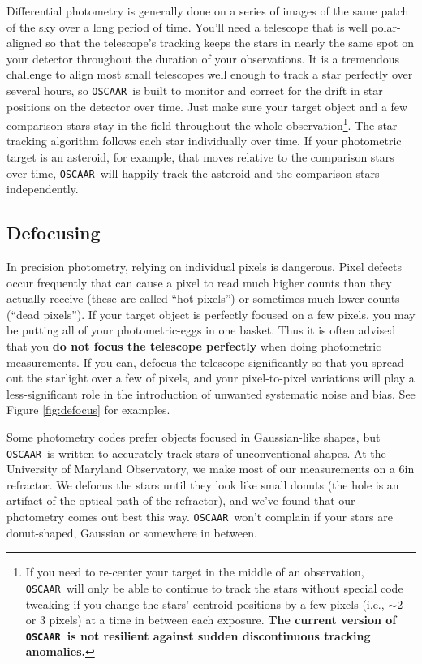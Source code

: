 \documentclass[a4paper]{article}
\newcommand{\code}[1]{\texttt{#1}}
\newcommand{\oscaar}{\code{OSCAAR}~}
\begin{document}
Differential photometry is generally done on a series of images of the same patch of the sky over a long period of time. You'll need a telescope that is well polar-aligned so that the telescope's tracking keeps the stars in nearly the same spot on your detector throughout the duration of your observations. It is a tremendous challenge to align most small telescopes well enough to track a star perfectly over several hours, so \oscaar is built to monitor and correct for the drift in star positions on the detector over time. Just make sure your target object and a few comparison stars stay in the field throughout the whole observation\footnote{If you need to re-center your target in the middle of an observation, \oscaar will only be able to continue to track the stars without special code tweaking if you change the stars' centroid positions by a few pixels (i.e., $\sim$2 or 3 pixels) at a time in between each exposure. \textbf{The current version of \oscaar is not resilient against sudden discontinuous tracking anomalies.}}. The star tracking algorithm follows each star individually over time. If your photometric target is an asteroid, for example, that moves relative to the comparison stars over time, \oscaar will happily track the asteroid and the comparison stars independently. 

\subsection{Defocusing} \label{sec:defocusing}

In precision photometry, relying on individual pixels is dangerous. Pixel defects occur frequently that can cause a pixel to read much higher counts than they actually receive (these are called ``hot pixels'') or sometimes much lower counts (``dead pixels''). If your target object is perfectly focused on a few pixels, you may be putting all of your photometric-eggs in one basket. Thus it is often advised that you \textbf{do not focus the telescope perfectly} when doing photometric measurements. If you can, defocus the telescope significantly so that you spread out the starlight over a few of pixels, and your pixel-to-pixel variations will play a less-significant role in the introduction of unwanted systematic noise and bias. See Figure \ref{fig:defocus} for examples.

Some photometry codes prefer objects focused in Gaussian-like shapes, but \oscaar is written to accurately track stars of unconventional shapes. At the University of Maryland Observatory, we make most of our measurements on a 6in refractor. We defocus the stars until they look like small donuts (the hole is an artifact of the optical path of the refractor), and we've found that our photometry comes out best this way. \oscaar won't complain if your stars are donut-shaped, Gaussian or somewhere in between. 
\end{document}
